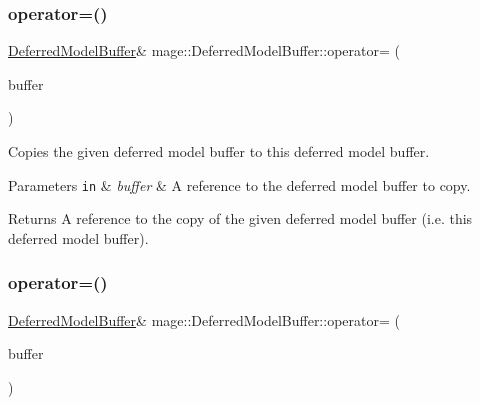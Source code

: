 \subsubsection{\texorpdfstring{operator=()}{operator=()}\hspace{0.1cm}{\footnotesize\ttfamily [1/2]}}
{\footnotesize\ttfamily \hyperlink{structmage_1_1_deferred_model_buffer}{Deferred\+Model\+Buffer}\& mage\+::\+Deferred\+Model\+Buffer\+::operator= (\begin{DoxyParamCaption}\item[{const \hyperlink{structmage_1_1_deferred_model_buffer}{Deferred\+Model\+Buffer} \&}]{buffer }\end{DoxyParamCaption})\hspace{0.3cm}{\ttfamily [default]}}

Copies the given deferred model buffer to this deferred model buffer.


\begin{DoxyParams}[1]{Parameters}
\mbox{\tt in}  & {\em buffer} & A reference to the deferred model buffer to copy. \\
\hline
\end{DoxyParams}
\begin{DoxyReturn}{Returns}
A reference to the copy of the given deferred model buffer (i.\+e. this deferred model buffer). 
\end{DoxyReturn}
\hypertarget{structmage_1_1_deferred_model_buffer_aa5bc6dff6a80b1f1ea8b5d8d5db1ef75}{}\label{structmage_1_1_deferred_model_buffer_aa5bc6dff6a80b1f1ea8b5d8d5db1ef75} 
\subsubsection{\texorpdfstring{operator=()}{operator=()}\hspace{0.1cm}{\footnotesize\ttfamily [2/2]}}
{\footnotesize\ttfamily \hyperlink{structmage_1_1_deferred_model_buffer}{Deferred\+Model\+Buffer}\& mage\+::\+Deferred\+Model\+Buffer\+::operator= (\begin{DoxyParamCaption}\item[{\hyperlink{structmage_1_1_deferred_model_buffer}{Deferred\+Model\+Buffer} \&\&}]{buffer }\end{DoxyParamCaption})\hspace{0.3cm}{\ttfamily [default]}}

